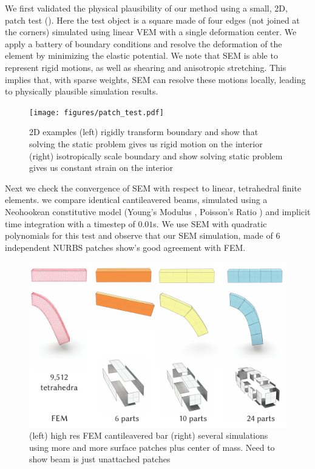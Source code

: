 

We first validated the physical plausibility of our method using a small, 2D, patch test (). 
Here the test object is a square made of four edges (not joined at the corners) simulated using linear VEM with a single deformation center.
We apply a battery of boundary conditions and resolve the deformation of the element by minimizing the elastic potential.
We note that SEM is able to represent rigid motions, as well as shearing and anisotropic stretching. 
This implies that, with sparse weights, SEM can resolve these motions locally, leading to physically plausible simulation results.

\begin{figure}[h]
  \texttt{[image: figures/patch\_test.pdf]}
  \caption{2D examples (left) rigidly transform boundary and show that solving the static problem gives us rigid motion on the interior (right) isotropically scale boundary and show solving static problem gives us constant strain on the interior}
  \label{fig:patchtest}
\end{figure}

Next we check the convergence of SEM with respect to linear, tetrahedral finite elements.  we compare identical cantileavered beams, simulated using 
a Neohookean constitutive model (Young's Modulus , Poisson's Ratio ) and implicit time integration with a timestep of $0.01$s. 
We use SEM with quadratic polynomials for this test and observe that our SEM simulation, made of 6 independent NURBS patches show's good agreement with FEM.
\begin{figure}[h]
  \includegraphics[width=\columnwidth]{figures/beams.pdf}
  \caption{(left) high res FEM cantileavered bar (right) several simulations using more and more surface patches plus center of mass. Need to show beam is just  unattached patches}
  \label{fig:convergence}
\end{figure}

